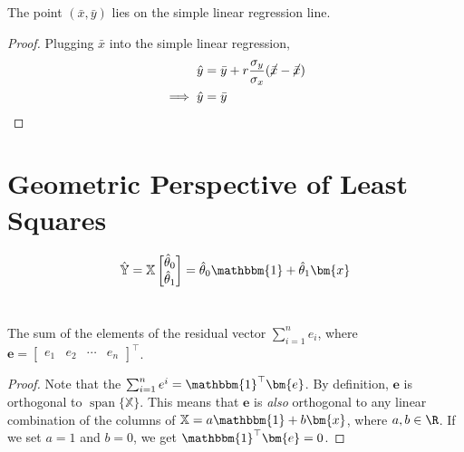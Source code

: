 \documentclass{article}
\newcommand{\X}{\mathbb{X}}
\newcommand{\Y}{\mathbb{Y}}
\newcommand{\One}{\mathbbm{1}}
\DeclareMathOperator{\Span}{span}
\begin{document}
\subsection{}

\begin{theorem}
    The point \((\bar{x}, \bar{y})\) lies on the simple linear regression line.
\end{theorem}
\begin{proof}
    Plugging \(\bar{x}\) into the simple linear regression,
    \begin{align}
        \hat{y} &= \bar{y} + r \frac{\sigma_y}{\sigma_x} (\cancel{\bar{x}} - \cancel{\bar{x}}) \\
        \implies \hat{y} &= \bar{y}
    \end{align}
\end{proof}

\section*{Geometric Perspective of Least Squares}

\begin{equation}
    \hat{\Y} =
    \X
    \begin{bmatrix}
        \hat{\theta}_0 \\
        \hat{\theta}_1
    \end{bmatrix} = \hat{\theta}_0 \One + \hat{\theta}_1 \bm{x}
\end{equation}

\section{}

\subsection{}

\begin{theorem}
    The sum of the elements of the residual vector \(\sum_{i = 1}^n e_i\), where \(\bm{e} =
    \begin{bmatrix}
        e_1 & e_2 & \cdots & e_n
    \end{bmatrix}^\top\).
\end{theorem}
\begin{proof}
    Note that the \(\sum_{i = 1}^n e^i = \One^\top \bm{e}\).
    By definition, \(\bm{e}\) is orthogonal to \(\Span\{\X\}\).
    This means that \(\bm{e}\) is \emph{also} orthogonal to any linear combination of the columns of \(\X = a\One + b\bm{x}\), where \(a, b \in \R\).
    If we set \(a = 1\) and \(b = 0\), we get \(\One^\top \bm{e} = 0\).
\end{proof}
\end{document}
